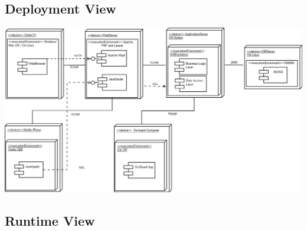 \documentclass{article}
\begin{document}
\begin{flushleft}
\subsection{Deployment View}  %
\vspace{4cm}

\includegraphics[scale=0.3]{deployment} 





\subsection{Runtime View} %


\end{flushleft}
\end{document}

